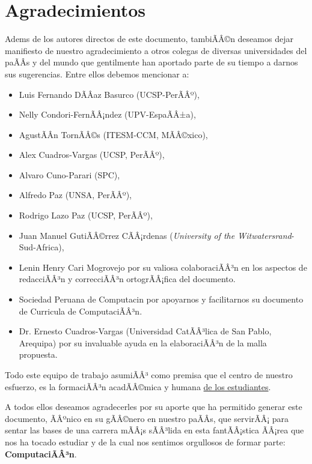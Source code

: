 \chapter*{Agradecimientos}\label{chap:cs-ack}
%

Adem s de los autores directos de este documento, tambiÃÂ©n deseamos dejar manifiesto de nuestro 
agradecimiento a otros colegas de diversas universidades del paÃÂ­s y del mundo que gentilmente 
han aportado parte de su tiempo a darnos sus sugerencias. Entre ellos debemos mencionar a:

\begin{itemize}
\item Luis Fernando DÃÂ­az Basurco (UCSP-PerÃÂº), 
\item Nelly Condori-FernÃÂ¡ndez (UPV-EspaÃÂ±a), 
\item AgustÃÂ­n TornÃÂ©s (ITESM-CCM, MÃÂ©xico), 
\item Alex Cuadros-Vargas (UCSP, PerÃÂº),
\item Alvaro Cuno-Parari (SPC),
\item Alfredo Paz (UNSA, PerÃÂº), 
\item Rodrigo Lazo Paz (UCSP, PerÃÂº),
\item Juan Manuel GutiÃÂ©rrez CÃÂ¡rdenas (\textit{University of the Witwatersrand}-Sud-Africa),
\item Lenin Henry Cari Mogrovejo por su valiosa colaboraciÃÂ³n en los aspectos de redacciÃÂ³n y correcciÃÂ³n ortogrÃÂ¡fica del documento.

\item Sociedad Peruana de Computaci n por apoyarnos y facilitarnos su documento de Curricula de ComputaciÃÂ³n.
\item Dr. Ernesto Cuadros-Vargas (Universidad CatÃÂ³lica de San Pablo, Arequipa) por su invaluable ayuda en la elaboraciÃÂ³n de la malla propuesta. 
\end{itemize}

Todo este equipo de trabajo asumiÃÂ³ como premisa que el centro de nuestro esfuerzo, 
es la formaciÃÂ³n acadÃÂ©mica y humana \underline{de los estudiantes}.

A todos ellos deseamos agradecerles por su aporte que ha permitido generar 
este documento, ÃÂºnico en su gÃÂ©nero en nuestro paÃÂ­s, que servirÃÂ¡ para sentar las 
bases de una carrera mÃÂ¡s sÃÂ³lida en esta fantÃÂ¡stica ÃÂ¡rea que nos ha tocado estudiar y 
de la cual nos sentimos orgullosos de formar parte: \textbf{ComputaciÃÂ³n}.

